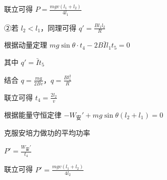 \documentclass[\gkver]{gaokaozhenti}
\begin{document}
\begin{enumerate}
{联立可得 $P = \frac{mgv(l_{1} + l_{2})}{4l_{1}}$

②若 $l_{2} < l_{1}$，同理可得 $q' = \frac{Bl_{1}l_{2}}{R}$

根据动量定理 $mg\sin\theta \cdot t_{4} - 2B\bar{I}l_{1}t_{5} = 0$

其中 $q' = \bar{I}t_{5}$

结合 $q = \frac{mg}{2Bv}$，$q = \frac{Bl_{1}^{2}}{R}$

联立可得 $t_{4} = \frac{2l_{2}}{v}$

根据能量守恒定律 $-W_{\text{安}}' + mg\sin\theta(l_{2} + l_{1}) = 0$

克服安培力做功的平均功率

$P' = \frac{W_{\text{安}}'}{t_{4}}$

联立可得 $P' = \frac{mgv(l_{1} + l_{2})}{4l_{2}}$
}

\end{enumerate}
\end{document}
